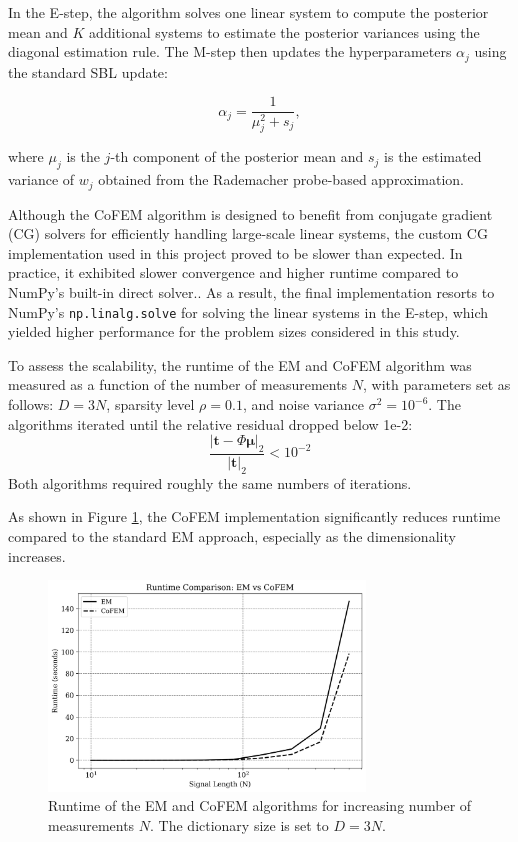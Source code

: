 \documentclass{article}
\begin{document}
In the E-step, the algorithm solves one linear system to compute the posterior mean and $ K $ additional systems to estimate the posterior variances using the diagonal estimation rule. The M-step then updates the hyperparameters $ \alpha_j $ using the standard SBL update:

\begin{equation}
    \alpha_j = \frac{1}{\mu_j^2 + s_j},
\end{equation}

where $ \mu_j $ is the $ j $-th component of the posterior mean and $ s_j $ is the estimated variance of $ w_j $ obtained from the Rademacher probe-based approximation.

Although the CoFEM algorithm is designed to benefit from conjugate gradient (CG) solvers for efficiently handling large-scale linear systems, the custom CG implementation used in this project proved to be slower than expected. In practice, it exhibited slower convergence and higher runtime compared to NumPy’s built-in direct solver.. As a result, the final implementation resorts to NumPy’s \texttt{np.linalg.solve} for solving the linear systems in the E-step, which yielded higher performance for the problem sizes considered in this study.

To assess the scalability, the runtime of the EM and CoFEM algorithm was measured as a function of the number of measurements $ N $, with parameters set as follows:  $ D = 3N $, sparsity level $ \rho = 0.1 $, and noise variance $ \sigma^2 = 10^{-6} $. The algorithms iterated until the relative residual dropped below 1e-2:
\begin{equation}
\frac{|\mathbf{t} - \Phi \boldsymbol{\mu}|_2}{|\mathbf{t}|_2} < 10^{-2}
\end{equation}
Both algorithms required roughly the same numbers of iterations.

As shown in Figure \ref{fig:runtime_comparison}, the CoFEM implementation significantly reduces runtime compared to the standard EM approach, especially as the dimensionality increases.

\begin{figure}[H]
    \centering
    \includegraphics[width=0.75\textwidth]{Figures/runtime_comp.png}
    \caption{Runtime of the EM and CoFEM algorithms for increasing number of measurements $ N $. The dictionary size is set to $ D = 3N $.}
    \label{fig:runtime_comparison}
\end{figure}
\end{document}
